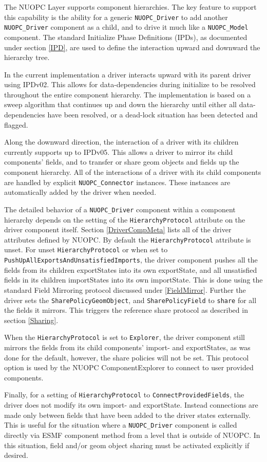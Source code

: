 %

\label{ComponentHierarchy}

The NUOPC Layer supports component hierarchies. The key feature to support this capability is the ability for a generic {\tt NUOPC\_Driver} to add another {\tt NUOPC\_Driver} component as a child, and to drive it much like a {\tt NUOPC\_Model} component. The standard Initialize Phase Definitions (IPDs), as documented under section \ref{IPD}, are used to define the interaction upward and downward the hierarchy tree.

In the current implementation a driver interacts upward with its parent driver using IPDv02. This allows for data-dependencies during initialize to be resolved throughout the entire component hierarchy. The implementation is based on a sweep algorithm that continues up and down the hierarchy until either all data-dependencies have been resolved, or a dead-lock situation has been detected and flagged.

Along the downward direction, the interaction of a driver with its children currently supports up to IPDv05. This allows a driver to mirror its child components' fields, and to transfer or share geom objects and fields up the component hierarchy. All of the interactions of a driver with its child components are handled by explicit {\tt NUOPC\_Connector} instances. These instances are automatically added by the driver when needed.

The detailed behavior of a {\tt NUOPC\_Driver} component within a component hierarchy depends on the setting of the {\tt HierarchyProtocol} attribute on the driver component itself. Section \ref{DriverCompMeta} lists all of the driver attributes defined by NUOPC. By default the {\tt HierarchyProtocol} attribute is unset. For unset {\tt HierarchyProtocol} or when set to {\tt PushUpAllExportsAndUnsatisfiedImports}, the driver component pushes all the fields from its children exportStates into its own exportState, and all unsatisfied fields in its children importStates into its own importState. This is done using the standard Field Mirroring protocol discussed under \ref{FieldMirror}. Further the driver sets the {\tt SharePolicyGeomObject}, and 
{\tt SharePolicyField} to {\tt share} for all the fields it mirrors. This triggers the reference share protocol as described in section \ref{Sharing}.

When the {\tt HierarchyProtocol} is set to {\tt Explorer}, the driver component still mirrors the fields from its child components' import- and exportStates, as was done for the default, however, the share policies will not be set. This protocol option is used by the NUOPC ComponentExplorer to connect to user provided components.

Finally, for a setting of {\tt HierarchyProtocol} to {\tt ConnectProvidedFields}, the driver does not modify its own import- and exportState. Instead connections are made only between fields that have been added to the driver states externally. This is useful for the situation where a {\tt NUOPC\_Driver} component is called directly via ESMF component method from a level that is outside of NUOPC. In this situation, field and/or geom object sharing must be activated explicitly if desired.

